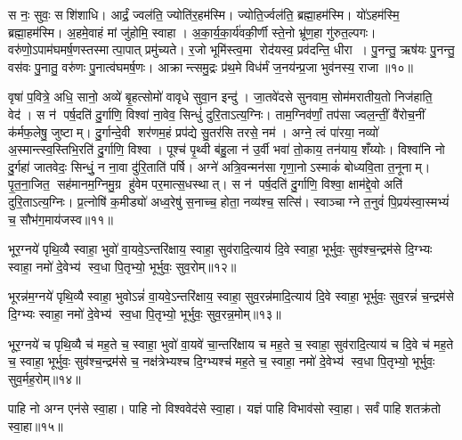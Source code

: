 स नः॒ सुवः॒ सशि॑शाधि। आर्द्रं॒ ज्वल॑ति॒ ज्योति॑र॒हम॑स्मि। ज्योति॒र्ज्वल॑ति॒ ब्रह्मा॒हम॑स्मि। यो॑ऽहम॑स्मि॒ ब्रह्मा॒हम॑स्मि। अ॒हमे॒वाहं मां जु॑होमि॒ स्वाहा। अ॒का॒र्य॒का॒र्य॑वकी॒र्णी स्ते॒नो भ्रू॑ण॒हा गु॑रुत॒ल्पगः। वरु॑णो॒ऽपाम॑घमर्\mbox{}ष॒णस्तस्मात्पा॒पात् प्रमु॑च्यते। र॒जो भूमि॑स्त्व॒मा रोद॑यस्व॒ प्रव॑दन्ति॒ धीरा। पु॒नन्तु॒ ऋष॑यः पु॒नन्तु॒ वस॑वः पु॒नातु॒ वरु॑णः पु॒नात्व॑घमर्\mbox{}ष॒णः। आक्रान्त्समु॒द्रः प्र॑थ॒मे विध॑र्मं ज॒नय॑न्प्र॒जा भुव॑नस्य॒ राजा॥१०॥

वृषा॑ प॒वित्रे॒ अधि॒ सानो॒ अव्ये॑ बृ॒हत्सोमो॑ वावृधे सुवा॒न इन्दु॑। जा॒तवे॑दसे सुनवाम॒ सोम॑मरातीय॒तो निज॑हाति॒ वेद॑। स न॑ पर्\mbox{}ष॒दति॑ दु॒र्गाणि॒ विश्वा॑ ना॒वेव॒ सिन्धुं॑ दुरि॒ताऽत्य॒ग्निः। ताम॒ग्निव॑र्णां॒ तप॑सा ज्वल॒न्तीं॒ वै॑रोच॒नीं क॑र्मफ॒लेषु॒ जुष्टाम्। दु॒र्गान्दे॒वी शर॑णम॒हं प्रप॑द्ये सु॒तर॑सि तरसे॒ नम॑। अग्ने॒ त्वं पा॑रया॒ नव्यो॑ अ॒स्मान्त्स्व॒स्तिभि॒रति॑ दु॒र्गाणि॒ विश्वा। पूश्च॑ पृ॒थ्वी ब॑हु॒ला न॑ उ॒र्वी भवा॑ तो॒काय॒ तन॑याय॒ शँय्योः। विश्वा॑नि नो दु॒र्गहा॑ जातवेदः॒ सिन्धुं॒ न ना॒वा दु॑रि॒ताति॑ पर्\mbox{}षि। अग्ने॑ अत्रि॒वन्मन॑सा गृणा॒नोऽस्माकं॑ बोध्यवि॒ता त॒नूनाम्। पृ॒त॒ना॒जित॒ सह॑मानम॒ग्निमु॒ग्र हु॑वेम पर॒मात्स॒धस्थात्। स न॑ पर्\mbox{}ष॒दति॑ दु॒र्गाणि॒ विश्वा॒ क्षाम॑द्दे॒वो अति॑ दुरि॒ताऽत्य॒ग्निः। प्र॒त्नोषि॑ क॒मीड्यो॑ अध्व॒रेषु॑ स॒नाच्च॒ होता॒ नव्य॑श्च॒ सत्सि॑। स्वाञ्चाग्ने त॒नुवं॑ पि॒प्रय॑स्वा॒स्मभ्यं॑ च॒ सौभ॑ग॒माय॑जस्व॥११॥



भूर॒ग्नये॑ पृथि॒व्यै स्वाहा॒ भुवो॑ वा॒यवे॒ऽन्तरि॑क्षाय॒ स्वाहा॒ सुव॑रादि॒त्याय॑ दि॒वे स्वाहा॒ भूर्भुवः॒ सुव॑श्च॒न्द्रम॑से दि॒ग्भ्यः स्वाहा॒ नमो॑ दे॒वेभ्य॑ स्व॒धा पि॒तृभ्यो॒ भूर्भुवः॒ सुव॒रोम्॥१२॥
\anuvakamend


भूरन्न॑म॒ग्नये॑ पृथि॒व्यै स्वाहा॒ भुवोऽन्नं॑ वा॒यवे॒ऽन्तरि॑क्षाय॒ स्वाहा॒ सुव॒रन्न॑मादि॒त्याय॑ दि॒वे स्वाहा॒ भूर्भुवः॒ सुव॒रन्नं॑ च॒न्द्रम॑से दि॒ग्भ्यः स्वाहा॒ नमो॑ दे॒वेभ्य॑ स्व॒धा पि॒तृभ्यो॒ भूर्भुवः॒ सुव॒रन्न॒मोम्॥१३॥
\anuvakamend


भूर॒ग्नये॑ च पृथि॒व्यै च॑ मह॒ते च॒ स्वाहा॒ भुवो॑ वा॒यवे॑ चा॒न्तरि॑क्षाय च मह॒ते च॒ स्वाहा॒ सुव॑रादि॒त्याय॑ च दि॒वे च॑ मह॒ते च॒ स्वाहा॒ भूर्भुवः॒ सुव॑श्च॒न्द्रम॑से च॒ नक्ष॑त्रेभ्यश्च दि॒ग्भ्यश्च॑ मह॒ते च॒ स्वाहा॒ नमो॑ दे॒वेभ्य॑ स्व॒धा पि॒तृभ्यो॒ भूर्भुवः॒ सुव॒र्मह॒रोम्॥१४॥ %
\anuvakamend


पाहि नो अग्न एन॑से स्वा॒हा। पाहि नो विश्ववेद॑से स्वा॒हा। यज्ञं पाहि विभाव॑सो स्वा॒हा। सर्वं पाहि शतक्र॑तो स्वा॒हा॥१५॥
\anuvakamend


